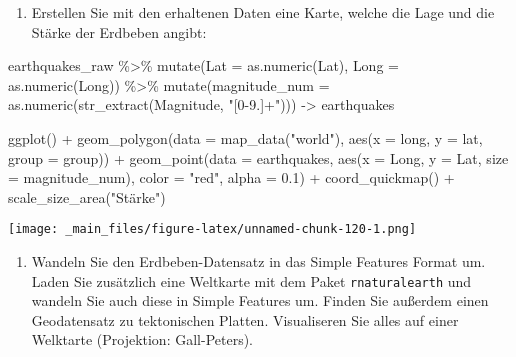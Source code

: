 \documentclass[11pt,german,a4paper]{article}
\newenvironment{Shaded}{\begin{snugshade}}{\end{snugshade}}
\newcommand{\AttributeTok}[1]{\textcolor[rgb]{0.77,0.63,0.00}{#1}}
\newcommand{\FloatTok}[1]{\textcolor[rgb]{0.00,0.00,0.81}{#1}}
\newcommand{\FunctionTok}[1]{\textcolor[rgb]{0.00,0.00,0.00}{#1}}
\newcommand{\NormalTok}[1]{#1}
\newcommand{\OtherTok}[1]{\textcolor[rgb]{0.56,0.35,0.01}{#1}}
\newcommand{\SpecialCharTok}[1]{\textcolor[rgb]{0.00,0.00,0.00}{#1}}
\newcommand{\StringTok}[1]{\textcolor[rgb]{0.31,0.60,0.02}{#1}}
\providecommand{\tightlist}{%
  \setlength{\itemsep}{0pt}\setlength{\parskip}{0pt}}
\begin{document}
\begin{enumerate}
\def\labelenumi{\arabic{enumi}.}
\setcounter{enumi}{1}
\tightlist
\item
  Erstellen Sie mit den erhaltenen Daten eine Karte, welche die Lage und die Stärke der Erdbeben angibt:
\end{enumerate}

\begin{Shaded}
\begin{Highlighting}[]
\NormalTok{earthquakes\_raw }\SpecialCharTok{\%\textgreater{}\%}
  \FunctionTok{mutate}\NormalTok{(}\AttributeTok{Lat =} \FunctionTok{as.numeric}\NormalTok{(Lat), }\AttributeTok{Long =} \FunctionTok{as.numeric}\NormalTok{(Long)) }\SpecialCharTok{\%\textgreater{}\%}
  \FunctionTok{mutate}\NormalTok{(}\AttributeTok{magnitude\_num =} \FunctionTok{as.numeric}\NormalTok{(}\FunctionTok{str\_extract}\NormalTok{(Magnitude, }\StringTok{"[0{-}9.]+"}\NormalTok{))) }\OtherTok{{-}\textgreater{}}\NormalTok{ earthquakes}

\FunctionTok{ggplot}\NormalTok{() }\SpecialCharTok{+}
  \FunctionTok{geom\_polygon}\NormalTok{(}\AttributeTok{data =} \FunctionTok{map\_data}\NormalTok{(}\StringTok{"world"}\NormalTok{), }\FunctionTok{aes}\NormalTok{(}\AttributeTok{x =}\NormalTok{ long, }\AttributeTok{y =}\NormalTok{ lat, }\AttributeTok{group =}\NormalTok{ group)) }\SpecialCharTok{+}
  \FunctionTok{geom\_point}\NormalTok{(}\AttributeTok{data =}\NormalTok{ earthquakes,}
             \FunctionTok{aes}\NormalTok{(}\AttributeTok{x =}\NormalTok{ Long, }\AttributeTok{y =}\NormalTok{ Lat, }\AttributeTok{size =}\NormalTok{ magnitude\_num),}
             \AttributeTok{color =} \StringTok{"red"}\NormalTok{, }\AttributeTok{alpha =} \FloatTok{0.1}\NormalTok{) }\SpecialCharTok{+}
  \FunctionTok{coord\_quickmap}\NormalTok{() }\SpecialCharTok{+}
  \FunctionTok{scale\_size\_area}\NormalTok{(}\StringTok{"Stärke"}\NormalTok{)}
\end{Highlighting}
\end{Shaded}

\texttt{[image: \_main\_files/figure-latex/unnamed-chunk-120-1.png]}

\begin{enumerate}
\def\labelenumi{\arabic{enumi}.}
\setcounter{enumi}{2}
\tightlist
\item
  Wandeln Sie den Erdbeben-Datensatz in das Simple Features Format um. Laden Sie zusätzlich eine Weltkarte mit dem Paket \texttt{rnaturalearth} und wandeln Sie auch diese in Simple Features um. Finden Sie außerdem einen Geodatensatz zu tektonischen Platten. Visualiseren Sie alles auf einer Welktarte (Projektion: Gall-Peters).
\end{enumerate}
\end{document}
